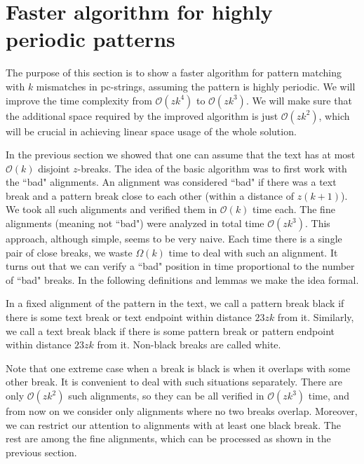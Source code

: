 \documentclass[runningheads]{llncs}
\begin{document}
\section{Faster algorithm for highly periodic patterns}
\label{section:faster}


The purpose of this section is to show a faster algorithm for pattern matching with $k$ mismatches in pc-strings, assuming the pattern is highly periodic. We will improve the time complexity from $\mathcal{O}(zk^4)$ to $\mathcal{O}(zk^3)$. We will make sure that the additional space required by the improved algorithm is just $\mathcal{O}(zk^2)$, which will
be crucial in achieving linear space usage of the whole solution.


In the previous section we showed that one can assume that the text has at most $\mathcal{O}(k)$ disjoint $z$-breaks. The idea of the basic algorithm was to first work with the ``bad" alignments. An alignment was considered ``bad" if there was a text break and a pattern break close to each other (within a distance of $z(k+1)$). We took all such alignments and verified them in $\mathcal{O}(k)$ time each. The fine alignments (meaning not ``bad") were analyzed in total time $\mathcal{O}(zk^3)$. This approach, although simple, seems to be very naive. Each time there is a single pair of close breaks, we waste $\Omega(k)$ time to deal with such an alignment. It turns out that we can verify a ``bad" position in time proportional to the number of ``bad" breaks. In the following definitions and lemmas we make the idea formal.


\begin{definition}
In a fixed alignment of the pattern in the text, we call a pattern break black if there is some text break or text endpoint within distance $23zk$ from it. Similarly, we call a text break black if there is some pattern break or pattern endpoint within distance $23zk$ from it. Non-black breaks are called white.
\end{definition}

Note that one extreme case when a break is black is when it overlaps with some other break. It is convenient to deal with such situations separately. There are only $\mathcal{O}(zk^2)$ such alignments, so they can be all verified in $\mathcal{O}(zk^3)$ time, and from now on we consider only alignments where no two breaks overlap. Moreover, we can restrict our attention to alignments with at least one black break. The rest are among the fine alignments, which can be processed as shown in the previous section.
\end{document}

